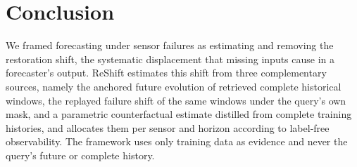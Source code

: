 \section{Conclusion}
\label{sec:conclusion}

We framed forecasting under sensor failures as estimating and removing the restoration shift, the systematic displacement that missing inputs cause in a forecaster's output. ReShift estimates this shift from three complementary sources, namely the anchored future evolution of retrieved complete historical windows, the replayed failure shift of the same windows under the query's own mask, and a parametric counterfactual estimate distilled from complete training histories, and allocates them per sensor and horizon according to label-free observability. The framework uses only training data as evidence and never the query's future or complete history. 
